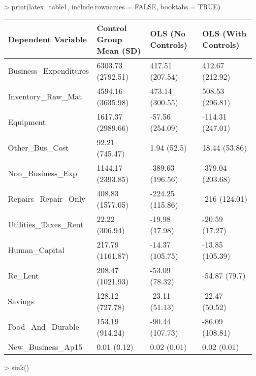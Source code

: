 
> print(latex_table1, include.rownames = FALSE, booktabs = TRUE)
\begin{table}[ht]
\centering
\begin{tabular}{llll}
  \toprule
Dependent Variable & Control Group Mean (SD) & OLS (No Controls) & OLS (With Controls) \\ 
  \midrule
Business\_Expenditures & 6303.73 (2792.51) & 417.51 (207.54) & 412.67 (212.92) \\ 
  Inventory\_Raw\_Mat & 4594.16 (3635.98) & 473.14 (300.55) & 508.53 (296.81) \\ 
  Equipment & 1617.37 (2989.66) & -57.56 (254.09) & -114.31 (247.01) \\ 
  Other\_Bus\_Cost & 92.21 (745.47) & 1.94 (52.5) & 18.44 (53.86) \\ 
  Non\_Business\_Exp & 1144.17 (2393.85) & -389.63 (196.56) & -379.04 (203.68) \\ 
  Repairs\_Repair\_Only & 408.83 (1577.05) & -224.25 (115.86) & -216 (124.01) \\ 
  Utilities\_Taxes\_Rent & 22.22 (306.94) & -19.98 (17.98) & -20.59 (17.27) \\ 
  Human\_Capital & 217.79 (1161.87) & -14.37 (105.75) & -13.85 (105.39) \\ 
  Re\_Lent & 208.47 (1021.93) & -53.09 (78.32) & -54.87 (79.7) \\ 
  Savings & 128.12 (727.78) & -23.11 (51.13) & -22.47 (50.52) \\ 
  Food\_And\_Durable & 153.19 (914.24) & -90.44 (107.73) & -86.09 (108.81) \\ 
  New\_Business\_Ap15 & 0.01 (0.12) & 0.02 (0.01) & 0.02 (0.01) \\ 
   \bottomrule
\end{tabular}
\end{table}

> sink()
